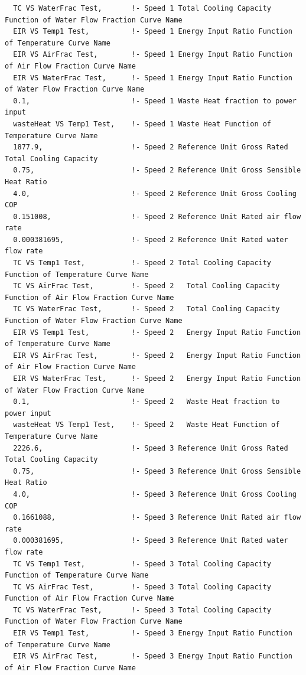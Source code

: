 \begin{lstlisting}
  TC VS WaterFrac Test,       !- Speed 1 Total Cooling Capacity Function of Water Flow Fraction Curve Name
  EIR VS Temp1 Test,          !- Speed 1 Energy Input Ratio Function of Temperature Curve Name
  EIR VS AirFrac Test,        !- Speed 1 Energy Input Ratio Function of Air Flow Fraction Curve Name
  EIR VS WaterFrac Test,      !- Speed 1 Energy Input Ratio Function of Water Flow Fraction Curve Name
  0.1,                        !- Speed 1 Waste Heat fraction to power input
  wasteHeat VS Temp1 Test,    !- Speed 1 Waste Heat Function of Temperature Curve Name
  1877.9,                     !- Speed 2 Reference Unit Gross Rated Total Cooling Capacity
  0.75,                       !- Speed 2 Reference Unit Gross Sensible Heat Ratio
  4.0,                        !- Speed 2 Reference Unit Gross Cooling COP
  0.151008,                   !- Speed 2 Reference Unit Rated air flow rate
  0.000381695,                !- Speed 2 Reference Unit Rated water flow rate
  TC VS Temp1 Test,           !- Speed 2 Total Cooling Capacity Function of Temperature Curve Name
  TC VS AirFrac Test,         !- Speed 2   Total Cooling Capacity Function of Air Flow Fraction Curve Name
  TC VS WaterFrac Test,       !- Speed 2   Total Cooling Capacity Function of Water Flow Fraction Curve Name
  EIR VS Temp1 Test,          !- Speed 2   Energy Input Ratio Function of Temperature Curve Name
  EIR VS AirFrac Test,        !- Speed 2   Energy Input Ratio Function of Air Flow Fraction Curve Name
  EIR VS WaterFrac Test,      !- Speed 2   Energy Input Ratio Function of Water Flow Fraction Curve Name
  0.1,                        !- Speed 2   Waste Heat fraction to power input
  wasteHeat VS Temp1 Test,    !- Speed 2   Waste Heat Function of Temperature Curve Name
  2226.6,                     !- Speed 3 Reference Unit Gross Rated Total Cooling Capacity
  0.75,                       !- Speed 3 Reference Unit Gross Sensible Heat Ratio
  4.0,                        !- Speed 3 Reference Unit Gross Cooling COP
  0.1661088,                  !- Speed 3 Reference Unit Rated air flow rate
  0.000381695,                !- Speed 3 Reference Unit Rated water flow rate
  TC VS Temp1 Test,           !- Speed 3 Total Cooling Capacity Function of Temperature Curve Name
  TC VS AirFrac Test,         !- Speed 3 Total Cooling Capacity Function of Air Flow Fraction Curve Name
  TC VS WaterFrac Test,       !- Speed 3 Total Cooling Capacity Function of Water Flow Fraction Curve Name
  EIR VS Temp1 Test,          !- Speed 3 Energy Input Ratio Function of Temperature Curve Name
  EIR VS AirFrac Test,        !- Speed 3 Energy Input Ratio Function of Air Flow Fraction Curve Name

\end{lstlisting}
